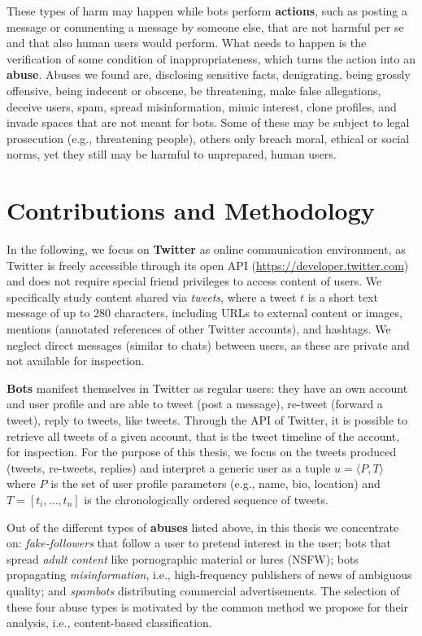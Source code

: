 These types of harm may happen while bots perform  \textbf{actions}, such as posting a message or commenting a message by someone else, that are not harmful per se and that also human users would perform. What needs to happen is the verification of some condition of inappropriateness, which turns the action into an \textbf{abuse}. Abuses we found are, disclosing sensitive facts, denigrating, being grossly offensive, being indecent or obscene, be threatening, make false allegations, deceive users, spam, spread misinformation, mimic interest, clone profiles, and invade spaces that are not meant for bots. Some of these may be subject to legal prosecution (e.g., threatening people), others only breach moral, ethical or social norms, yet they still may be harmful to unprepared, human users.

\section{Contributions and Methodology}
\label{sec:contributions}
In the following, we focus on \textbf{Twitter} as online communication environment, as Twitter is freely accessible through its open API (\url{https://developer.twitter.com}) and does not require special friend privileges to access content of users. We specifically study content shared via \emph{tweets}, where a tweet $t$ is a short text message of up to 280 characters, including URLs to external content or images, mentions (annotated references of other Twitter accounts), and hashtags. We neglect direct messages (similar to chats) between users, as these are private and not available for inspection. 

\textbf{Bots} manifest themselves in Twitter as regular users: they have an own account and user profile and are able to tweet (post a message), re-tweet (forward a tweet), reply to tweets, like tweets. Through the API of Twitter, it is possible to retrieve all tweets of a given account, that is the tweet timeline of the account, for inspection. For the purpose of this thesis, we focus on the tweets produced (tweets, re-tweets, replies) and interpret a generic user as a tuple $u = \langle P, T \rangle$ where $P$ is the set of 
user profile parameters (e.g., name, bio, location) and $T = [t_i,...,t_n]$ is the chronologically ordered sequence of tweets.

Out of the different types of \textbf{abuses} listed above, in this thesis we concentrate on: \emph{fake-followers} that follow a user to pretend interest in the user; bots that spread \emph{adult content} like pornographic material or lures (NSFW); bots propagating \emph{misinformation}, i.e., high-frequency publishers of news of ambiguous quality; and \emph{spambots} distributing commercial advertisements. The selection of these four abuse types is motivated by the common method we propose for their analysis, i.e., content-based classification.

